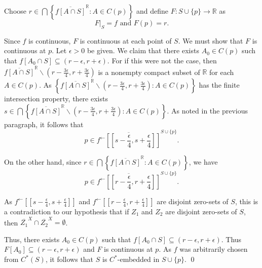 \documentclass{article}
\begin{document}
		  \vskip 20pt

		  Choose $r\in \bigcap \left\{\overline{f[A\cap S]}^\mathbb{R}: A\in C(p)\right\}$ and define $F:S\cup \{p\} \rightarrow \mathbb{R}$ as
		  $$ F|_S=f \mbox{ and } F(p)=r.$$

		  Since $f$ is continuous, $F$ is continuous at each point of $S$. We must show that $F$ is continuous at $p$. Let $\epsilon>0$ be given.
		  We claim that there exists $A_0\in C(p)$ such that $f\left[A_0\cap S\right] \subseteq (r-\epsilon, r+\epsilon).$ For if this were not the case, then $\overline{f\left[A\cap S\right]}^{\mathbb{R}}\backslash (r-\frac{3\epsilon}{4}, r+\frac{3\epsilon}{4})$ is a nonempty compact subset of $\mathbb{R}$ for each $A\in C(p).$ As $\left\{\overline{f[A\cap S]}^{\mathbb{R}}\backslash (r-\frac{3\epsilon}{4}, r+\frac{3\epsilon}{4}): A\in C(p)\right\}$ has the finite intersection property, there exists $s\in \bigcap \left\{\overline{f[A\cap S]}^{\mathbb{R}}\backslash (r-\frac{3\epsilon}{4}, r+\frac{3\epsilon}{4}): A\in C(p)\right\}$. As noted in the previous paragraph, it follows that $$p\in \overline{f^\leftarrow\left[[s-\frac{\epsilon}{4},s+\frac{\epsilon}{4}]\right]}^{S\cup \{p\}}.$$


		  \vskip 10pt

		  On the other hand, since $r\in \bigcap \left\{\overline{f[A\cap S]}^\mathbb{R}: A\in C(p)\right\}$, we have $$p\in \overline{f^\leftarrow \left[[r-\frac{\epsilon}{4}, r+\frac{\epsilon}{4}]\right] }^{S\cup \{p\}}.$$

		  \vskip 15pt


		  As  $f^\leftarrow\left[[s-\frac{\epsilon}{4},s+\frac{\epsilon}{4}]\right]$ and $f^\leftarrow \left[[r-\frac{\epsilon}{4}, r+\frac{\epsilon}{4}]\right]$ are disjoint zero-sets of $S$, this is a contradiction to our hypothesis that if $Z_1$ and $Z_2$ are disjoint zero-sets of $S$, then $\overline{Z_1}^X\cap \overline{Z_2}^X=\emptyset$. 

		  \vskip 20pt

		  Thus, there exists $A_0\in C(p)$ such that $f\left[A_0\cap S\right]\subseteq (r-\epsilon, r+\epsilon).$ Thus $F[A_0]\subseteq (r-\epsilon, r+\epsilon)$ and $F$ is continuous at $p$. As $f$ was arbitrarily chosen from $C^*(S)$, it follows that $S$ is $C^*$-embedded in $S\cup\{p\}.$ \qed








		  \vskip 40pt
\end{document}
